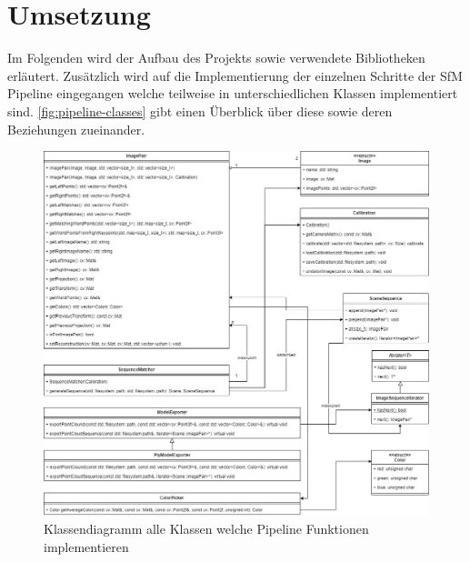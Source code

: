 \chapter{Umsetzung}\label{sec:implementation}
Im Folgenden wird der Aufbau des Projekts sowie verwendete Bibliotheken erläutert.
Zusätzlich wird auf die Implementierung der einzelnen Schritte der SfM Pipeline eingegangen welche teilweise in unterschiedlichen Klassen implementiert sind.
\autoref{fig:pipeline-classes} gibt einen Überblick über diese sowie deren Beziehungen zueinander.

\begin{figure}
    \centering
    \includegraphics[width=\textwidth]{src/img/classes.jpg}
    \caption{Klassendiagramm alle Klassen welche Pipeline Funktionen implementieren}
    \label{fig:pipeline-classes}
\end{figure}








